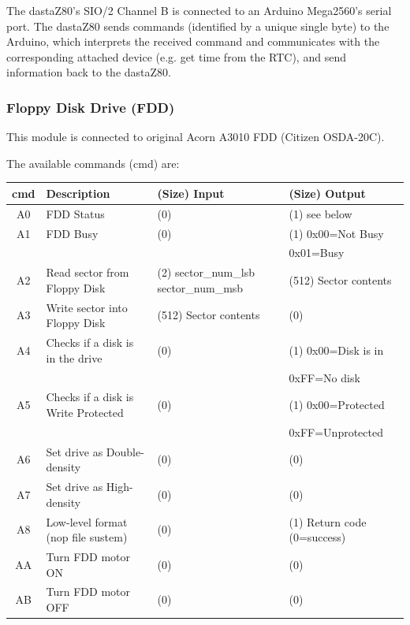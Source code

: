 \documentclass[a4paper,11pt]{article}
\begin{document}
    The dastaZ80's SIO/2 Channel B is connected to an Arduino Mega2560's serial
    port. The dastaZ80 sends commands (identified by a unique single byte) to
    the Arduino, which interprets the received command and communicates with the
    corresponding attached device (e.g. get time from the RTC), and send
    information back to the dastaZ80.

    \subsubsection{Floppy Disk Drive (FDD)}

    This module is connected to original Acorn A3010 FDD (Citizen OSDA-20C).

    The available commands (cmd) are:
 
     \begin{tabular}{| c | m{3.8cm} | m{3cm} | m{3.5cm} | }
         \hline
         \rowcolor{lightgray}
         cmd & Description & (Size) Input & (Size) Output\\
         \hline
         A0 & FDD Status & (0) & (1) see below\\
         \hline
         A1 & FDD Busy & (0) & (1) 0x00=Not Busy\\
            &          &     &     0x01=Busy\\
         \hline
         A2 & Read sector from Floppy Disk & (2) sector\_num\_lsb sector\_num\_msb & (512) Sector contents\\
         \hline
         A3 & Write sector into Floppy Disk & (512) Sector contents & (0) \\
         \hline
         A4 & Checks if a disk is in the drive & (0) & (1) 0x00=Disk is in\\
            &                                  &     &     0xFF=No disk\\
         \hline
         A5 & Checks if a disk is Write Protected & (0) & (1) 0x00=Protected\\
            &                                     &     &     0xFF=Unprotected\\
         \hline
         A6 & Set drive as Double-density & (0) & (0)\\
         \hline
         A7 & Set drive as High-density & (0) & (0)\\
         \hline
         A8 & Low-level format (nop file sustem) & (0) & (1) Return code (0=success)\\
         \hline
         AA & Turn FDD motor ON & (0) & (0)\\
         \hline
         AB & Turn FDD motor OFF & (0) & (0)\\
         \hline
     \end{tabular}
\end{document}

